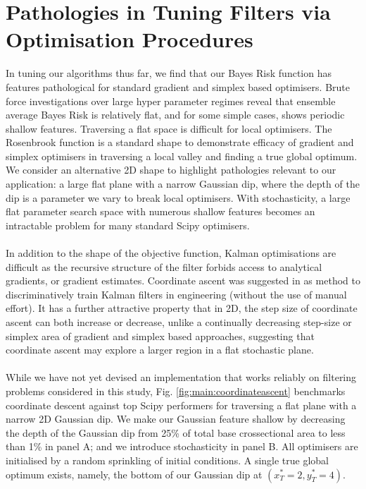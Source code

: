 \section{Pathologies in Tuning Filters via Optimisation Procedures}
In tuning our algorithms thus far, we find that our Bayes Risk function has features pathological for standard gradient and simplex based optimisers. Brute force investigations over large hyper parameter regimes reveal that ensemble average Bayes Risk is relatively flat, and for some simple cases, shows periodic shallow features.  Traversing a flat space is difficult for local optimisers. The Rosenbrook function is a standard shape  to demonstrate efficacy of  gradient and simplex optimisers in traversing a local valley and finding a true global optimum. We consider an alternative 2D shape to highlight pathologies relevant to our application: a large flat plane with a narrow Gaussian dip, where the depth of the dip is a parameter we vary to break local optimisers. With stochasticity, a large flat parameter search space with numerous shallow features becomes an intractable problem for many standard Scipy optimisers. 
\\
\\
In addition to the shape of the objective function, Kalman optimisations are difficult as the recursive structure of the filter forbids access to analytical gradients, or gradient estimates. Coordinate ascent was suggested in \cite{abbeel2005discriminative} as method to discriminatively train Kalman filters in engineering (without the use of manual effort). It has a further attractive property that in 2D, the step size of coordinate ascent can both increase or decrease, unlike a continually decreasing step-size or simplex area of gradient and simplex based approaches, suggesting that coordinate ascent may explore a larger region in a flat stochastic plane.
\\
\\
 While we have not yet devised an implementation that works reliably on filtering problems considered in this study, Fig. \ref{fig:main:coordinateascent} benchmarks coordinate descent against top Scipy performers for traversing a flat plane with a narrow 2D Gaussian dip. We make our Gaussian feature shallow by decreasing the depth of the Gaussian dip from 25\% of total base crossectional area to less than 1\% in panel A; and we introduce stochasticity in panel B. All optimisers are initialised by a random sprinkling of initial conditions. A single true global optimum exists, namely, the bottom of our Gaussian dip at $(x_T^*=2, y_T^*=4)$.

